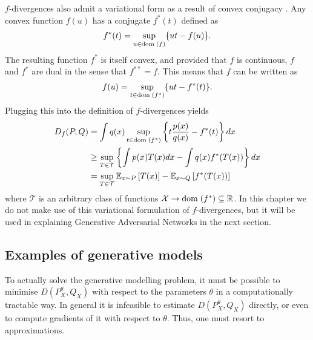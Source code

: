 


$f$-divergences also admit a variational form as a result of convex conjugacy \citep{nguyen10ratio}.
Any convex function $f(u)$ has a conjugate $f^*(t)$ defined as
%
\begin{align*}
f^*(t) = \sup_{u \in {\bf{\rm dom}}\;(f)} \{ut - f(u)\}.
\end{align*}
%
The resulting function $f^*$ is itself convex, and
provided that $f$ is continuous, $f$ and $f^*$ are dual in the sense that $f^{**} = f$.
This means that $f$ can be written as
%
\begin{align*}
f(u) = \sup_{t \in {\bf{\rm dom}}\;(f^*)} \{ut - f^*(t)\}.
\end{align*}
%
Plugging this into the definition of $f$-divergences yields
%
\begin{align*}
D_f(P, Q) &= \int q(x) \sup_{t \in {\bf{\rm dom}}\;(f^*)} \left\{t \frac{p(x)}{q(x)} - f^*(t) \right\} dx \\
& \geq \sup_{T \in \mathcal{T}} \left\{ \int p(x) T(x) dx - \int q(x) f^*(T(x)) \right\} dx \\
&= \sup_{T \in \mathcal{T}} \mathbb{E}_{x \sim P} \left[ T(x) \right] - \mathbb{E}_{x \sim Q} \left[ f^*(T(x)) \right] 
\end{align*}
where $\mathcal{T}$ is an arbitrary class of functions $\mathcal{X} \to {\bf{\rm dom}}\;(f^*) \subseteq \mathbb{R}$.
In this chapter we do not make use of this variational formulation of $f$-divergences, but it will be used in explaining Generative Adversarial Networks in the next section.

\subsection{Examples of generative models}

To actually solve the generative modelling problem, it must be possible to minimise $D(P^\theta_X, Q_X)$ with respect to the parameters $\theta$ in a computationally tractable way.
In general it is infeasible to estimate $D(P^\theta_X, Q_X)$ directly, or even to compute gradients of it with respect to $\theta$. 
Thus, one must resort to approximations.


